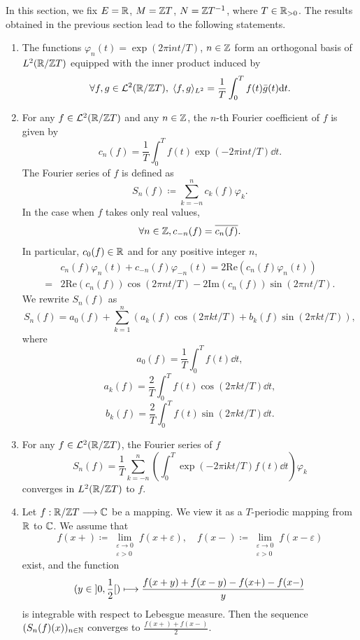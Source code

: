 In this section, we fix $E = \mathbb{R}$, $M = \mathbb{Z} T$, $N = \mathbb{Z} T^{-1}$, where $T \in \mathbb{R}_{> 0}$.
The results obtained in the previous section lead to the following statements.
\begin{enumerate}[label=(\arabic*)]
    \item The functions $\varphi_{n}(t) = \exp(2\pi\mathrm{i}nt/T)$, $n \in \mathbb{Z}$ form an orthogonal basis of $L^2(\mathbb{R}/\mathbb{Z} T)$ equipped with the inner product induced by 
        $$\forall f,g \in \mathcal{L}^2(\mathbb{R}/\mathbb{Z} T), \; \langle f,g \rangle_{L^2} = \frac{1}{T} \int_{0}^{T} f(t) \bar{g}(t) \mathrm{d} t.$$
    \item For any $f \in \mathcal{L}^{2}(\mathbb{R}/\mathbb{Z} T)$ and any $n \in \mathbb{Z}$, the $n$-th Fourier coefficient of $f$ is given by
        $$c_{n}(f) = \frac{1}{T} \int_{0}^{T} f(t) \exp(-2\pi\mathrm{i}n t/T) \dd t.$$
        The Fourier series of $f$ is defined as
        $$S_n(f) \coloneq \sum_{k=-n}^{n} c_{k}(f) \varphi_{k}.$$
        In the case when $f$ takes only real values,
        $$\forall n \in \mathbb{Z}, c_{-n}(f) = \overline{c_{n}(f)}.$$
        In particular, $c_{0}(f) \in \mathbb{R}$ and for any positive integer $n$,
        $$\begin{aligned}
            & c_n(f) \varphi_n(t) + c_{-n}(f) \varphi_{-n}(t) = 2 \mathrm{Re}(c_{n}(f) \varphi_{n}(t))\\
            = & 2 \mathrm{Re}(c_{n}(f)) \cos(2 \pi n t/T) - 2 \mathrm{Im}(c_{n}(f)) \sin(2 \pi n t/T).
        \end{aligned}$$
        We rewrite $S_n(f)$ as
        $$S_n(f) = a_0(f) + \sum_{k=1}^{n} (a_{k}(f) \cos(2 \pi k t/T) + b_{k}(f) \sin(2 \pi k t/T)),$$
        where
        $$a_0(f) = \frac{1}{T} \int_{0}^{T} f(t) \dd t,$$
        $$a_{k}(f) = \frac{2}{T} \int_{0}^{T} f(t) \cos(2 \pi k t/T) \dd t,$$
        $$b_{k}(f) = \frac{2}{T} \int_{0}^{T} f(t) \sin(2 \pi k t/T) \dd t.$$
    \item For any $f \in \mathcal{L}^{2}(\mathbb{R}/\mathbb{Z} T)$, the Fourier series of $f$
        $$S_n(f) = \frac{1}{T} \sum_{k=-n}^{n} \left(\int_{0}^{T}\exp(-2\pi\mathrm{i}kt/T) f(t) \dd t\right) \varphi_{k}$$
        converges in $L^2(\mathbb{R}/\mathbb{Z} T)$ to $f$.
    \item Let $f : \mathbb{R}/\mathbb{Z} T \longrightarrow \mathbb{C}$ be a mapping.
        We view it as a $T$-periodic mapping from $\mathbb{R}$ to $\mathbb{C}$.
        We assume that
        $$f(x +) \coloneq \lim_{\substack{\varepsilon \to 0\\\varepsilon > 0}} f(x + \varepsilon),\quad f(x-) \coloneq \lim_{\substack{\varepsilon \to 0\\\varepsilon > 0}} f(x - \varepsilon)$$
        exist, and the function
        $$(y \in \interval[open]{0}{\frac{1}{2}}) \longmapsto \frac{f(x + y) + f(x - y) - f(x + ) - f(x - )}{y}$$
        is integrable with respect to Lebesgue measure.
        Then the sequence $(S_{n}(f)(x))_{n \in \mathbb{N}}$ converges to $\frac{f(x+) + f(x-)}{2}$.
\end{enumerate}

